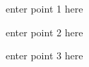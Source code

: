 \documentclass[draft]{agujournal2019}
\begin{document}
\begin{keypoints}
\item enter point 1 here
\item enter point 2 here
\item enter point 3 here
\end{keypoints}

%
%

%
%
\end{document}
